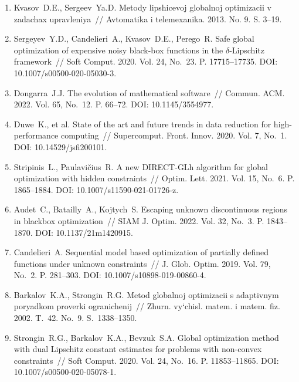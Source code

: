 \documentclass[a4paper,12pt,russian]{article}
\begin{document}
\begin{enumerate}
\item \label{rfa:enlit:Kvasov2013}
Kvasov~D.E., Sergeev~Ya.D. Metody lipshicevoj globalnoj optimizacii v zadachax upravleniya~// Avtomatika i telemexanika. 2013. No. 9. S. 3--19.

\item \label{rfa:enlit:Sergeyev2020}
Sergeyev~Y.D., Candelieri~A., Kvasov~D.E., Perego~R. Safe global optimization of expensive noisy black-box functions in the $\delta$-Lipschitz framework~// 
Soft Comput. 2020. Vol. 24, No.~23. P. 17715--17735. DOI: 10.1007/s00500-020-05030-3.

\item \label{rfa:enlit:Dongarra2022}
Dongarra~J.J. The evolution of mathematical software~// Commun. ACM. 2022. Vol. 65, No.~12. P. 66--72. DOI: 10.1145/3554977.

\item \label{rfa:enlit:Duwe2020}
Duwe~K., et al. State of the art and future trends in data reduction for high-performance computing~// Supercomput. Front. Innov. 2020. Vol. 7, No.~1. DOI: 10.14529/jsfi200101.

\item \label{rfa:enlit:Stripinis2021}
Stripinis~L., Paulavi{\v c}ius~R. A new {DIRECT}-{GLh} algorithm for global optimization with hidden constraints~// Optim. Lett. 2021. Vol. 15, No.~6. P. 1865--1884.
DOI: 10.1007/s11590-021-01726-z.

\item \label{rfa:enlit:Audet2022}
Audet~C., Batailly~A., Kojtych~S. Escaping unknown discontinuous regions in blackbox optimization~// SIAM J. Optim. 2022. Vol. 32, No.~3. P. 1843--1870. DOI: 10.1137/21m1420915.

\item \label{rfa:enlit:Candelieri2019}
Candelieri~A. Sequential model based optimization of partially defined functions
under unknown constraints~// J. Glob. Optim. 2019. Vol. 79, No.~2. P. 281--303. DOI: 10.1007/s10898-019-00860-4.

\item \label{rfa:enlit:Sergeyev2003}
Barkalov~K.A., Strongin~R.G. Metod globalnoj optimizacii s adaptivnym poryadkom proverki ogranichenij~// Zhurn. vy`chisl. matem. i matem. fiz. 2002. T.~42. No.~9. S.~1338--1350.

\item \label{rfa:enlit:Strongin2020}
Strongin~R.G., Barkalov~K.A., Bevzuk~S.A. Global optimization method with dual Lipschitz constant estimates for problems with non-convex constraints~// 
Soft Comput. 2020. Vol. 24, No.~16. P. 11853--11865. DOI: 10.1007/s00500-020-05078-1.


\end{enumerate}
\end{document}
